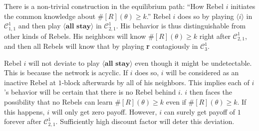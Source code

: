 \documentclass[12pt,letter]{article}
\newcommand{\Kappa}{\mathcal{C}}
\theoremstyle{definition}
\theoremstyle{remark}
\theoremstyle{claim}
\begin{document}
There is a non-trivial construction in the equilibrium path: ``How Rebel $i$ initiates the common knowledge about $\#[R](\theta)\geq k$.'' Rebel $i$ does so by playing $\langle i \rangle$ in $\Kappa^1_{1,1}$ and then play $\langle \textbf{all stay} \rangle$ in $\Kappa^1_{2,1}$. His behavior is thus distinguishable from other kinds of Rebels. His neighbors will know $\#[R](\theta)\geq k$ right after $\Kappa^1_{2,1}$, and then all Rebels will know that by playing \textbf{r} contagiously in $\Kappa^1_{3}$. 

Rebel $i$ will not deviate to play $\langle \textbf{all stay} \rangle$ even though it might be undetectable. This is because the network is acyclic. If $i$ does so, $i$ will be considered as an inactive Rebel at $1$-block afterwards by all of his neighbors. This implies each of $i$'s behavior will be certain that there is no Rebel behind $i$. $i$ then faces the possibility that no Rebels can learn $\#[R](\theta)\geq k$ even if $\#[R](\theta)\geq k$. If this happens, $i$ will only get zero payoff. However, $i$ can surely get payoff of $1$ forever after $\Kappa^1_{2,1}$. Sufficiently high discount factor will deter this deviation. 

\end{document}

